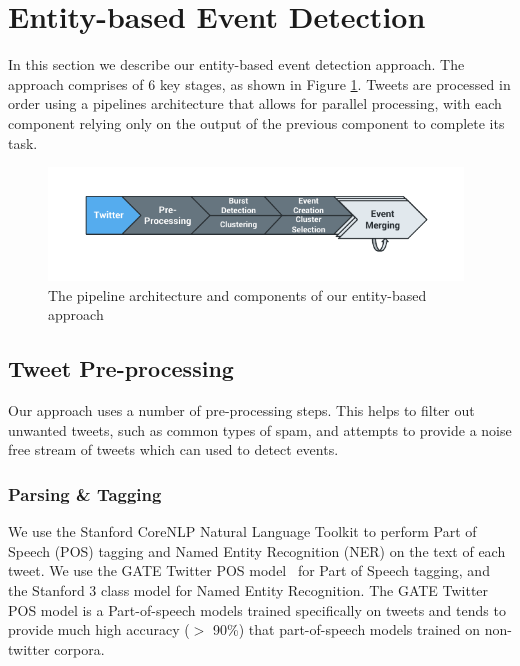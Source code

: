 
\section{Entity-based Event Detection}
\label{detection:sec:approach}
In this section we describe our entity-based event detection approach.
The approach comprises of 6 key stages, as shown in Figure \ref{detection:graphic:pipeline}.
Tweets are processed in order using a pipelines architecture that allows for parallel processing, with each component relying only on the output of the previous component to complete its task.

\vspace{0.5cm}
\begin{figure}[h!]
	\centering
	\includegraphics[width=11cm,trim=1.5cm 1cm 1.5cm 0.8cm]{Chapters/EntityDetection/images/system.pdf}
	\caption{The pipeline architecture and components of our entity-based approach}
	\label{detection:graphic:pipeline}
\end{figure}

\subsection{Tweet Pre-processing}
Our approach uses a number of pre-processing steps.
This helps to filter out unwanted tweets, such as common types of spam, and attempts to provide a noise free stream of tweets which can used to detect events.

\subsubsection{Parsing \& Tagging}
\label{detection:sec:parsing}
We use the Stanford CoreNLP Natural Language Toolkit to perform Part of Speech (POS) tagging and Named Entity Recognition (NER) on the text of each tweet.
We  use the GATE Twitter POS model~\citep{TwitterPOS} for Part of Speech tagging, and the Stanford 3 class model for Named Entity Recognition.
The GATE Twitter POS model is a Part-of-speech models trained specifically on tweets and tends to provide much high accuracy ($>$ 90\%) that part-of-speech models trained on non-twitter corpora.

